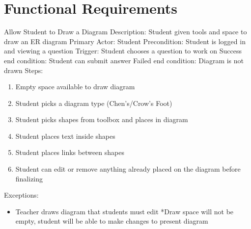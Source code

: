     \chapter{Functional Requirements}
    \begin{section}{Allow Student to Draw a Diagram}
        Description: Student given tools and space to draw an ER diagram \newline
        Primary Actor: Student \newline
        Precondition: Student is logged in and viewing a            question \newline
        Trigger: Student chooses a question to work on \newline
        Success end condition: Student can submit answer            \newline
        Failed end condition: Diagram is not drawn \newline
        \newline
        Steps:
        \begin{enumerate}
            \item{Empty space available to draw diagram}
            \item{Student picks a diagram type (Chen’s/Crow’s Foot)}
            \item{Student picks shapes from toolbox and places in           diagram}
            \item{Student places text inside shapes}
            \item{Student places links between shapes}
            \item{Student can edit or remove anything already placed on the diagram before finalizing}
        \end{enumerate}
        Exceptions:
        \begin{itemize}
            \item{Teacher draws diagram that students must edit             \newline
                *Draw space will not be empty, student will be able to           make changes to present diagram}
        \end{itemize}
    \end{section}

